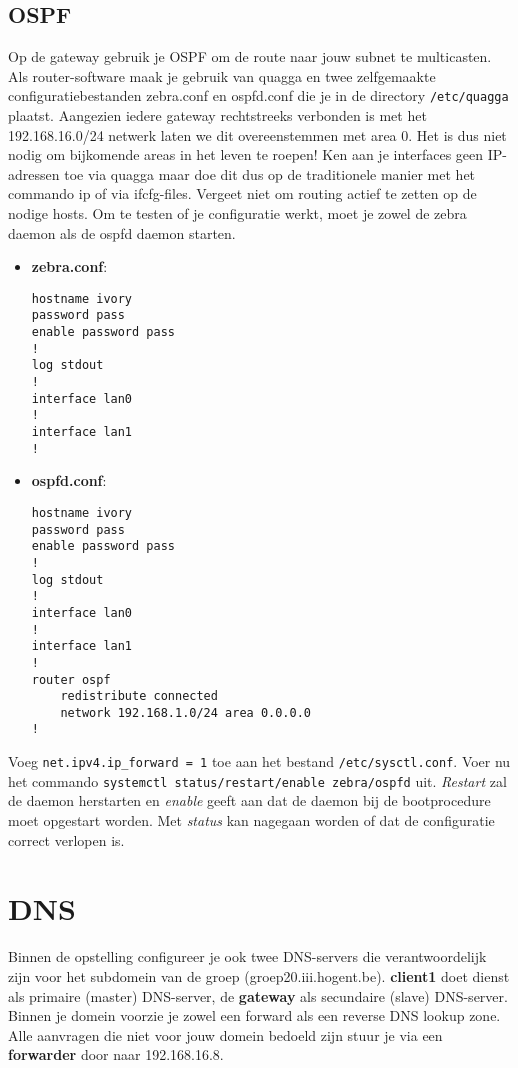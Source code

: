 \documentclass{report}
\begin{document}
\subsection{OSPF}

Op de gateway gebruik je OSPF om de route naar jouw subnet te multicasten. Als router-software maak je gebruik van quagga en twee zelfgemaakte configuratiebestanden zebra.conf en ospfd.conf die je in de directory \texttt{/etc/quagga} plaatst. Aangezien iedere gateway rechtstreeks verbonden is met het 192.168.16.0/24 netwerk laten we dit overeenstemmen met area 0. Het is dus niet nodig om bijkomende areas in het leven te roepen!
Ken aan je interfaces geen IP-adressen toe via quagga maar doe dit dus op de traditionele manier met het commando ip of via ifcfg-files.
Vergeet niet om routing actief te zetten op de nodige hosts.
Om te testen of je configuratie werkt, moet je zowel de zebra daemon als de ospfd daemon starten. 

\begin{itemize}
	\item \textbf{zebra.conf}:
		\begin{lstlisting}
hostname ivory
password pass
enable password pass
!
log stdout
!
interface lan0
!
interface lan1
!
		\end{lstlisting}
	\item \textbf{ospfd.conf}:
		\begin{lstlisting}
hostname ivory
password pass
enable password pass
!
log stdout
!
interface lan0
!
interface lan1
!
router ospf
	redistribute connected
	network 192.168.1.0/24 area 0.0.0.0
!
\end{lstlisting}

\end{itemize}
Voeg \texttt{net.ipv4.ip\_forward = 1} toe aan het bestand \texttt{/etc/sysctl.conf}. 
Voer nu het commando \texttt{systemctl status/restart/enable zebra/ospfd} uit. \textit{Restart} zal de daemon herstarten en \textit{enable} geeft aan dat de daemon bij de bootprocedure moet opgestart worden. Met \textit{status} kan nagegaan worden of dat de configuratie correct verlopen is.
\section{DNS}
Binnen de opstelling configureer je ook twee DNS-servers die verantwoordelijk zijn voor het subdomein van de groep (groep20.iii.hogent.be). \textbf{client1} doet dienst als primaire (master) DNS-server, de \textbf{gateway} als secundaire (slave) DNS-server. Binnen je domein voorzie je zowel een forward als een reverse DNS lookup zone. Alle aanvragen die niet voor jouw domein bedoeld zijn stuur je via een \textbf{forwarder} door naar 192.168.16.8. 
\end{document}
